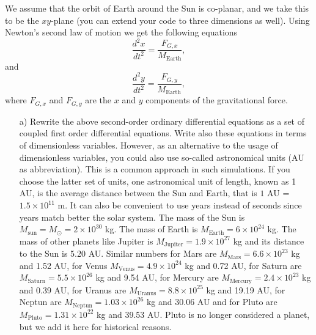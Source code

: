 \documentclass[11pt,a4wide]{article}
\begin{document}
We assume that the orbit of Earth around the Sun 
is co-planar, and we take this to be the $xy$-plane (you can extend your code to three dimensions as well).
Using Newton's second law of motion we get the following equations
\[
\frac{d^2x}{dt^2}=\frac{F_{G,x}}{M_{\mathrm{Earth}}},
\]
and 
\[
\frac{d^2y}{dt^2}=\frac{F_{G,y}}{M_{\mathrm{Earth}}},
\]
where $F_{G,x}$ and $F_{G,y}$ are the $x$ and $y$ components of the gravitational force. 
\begin{enumerate}
\item[a)]  Rewrite the above second-order ordinary differential equations as a set of coupled first order
differential equations. Write also these equations in terms of dimensionless  variables.  
However, as an alternative to the usage of dimensionless variables, you could also
use so-called  astronomical units (AU as abbreviation). 
This is a common approach in such simulations.
If you choose the latter set of units, 
one astronomical unit of length, known as 1 AU, is the average distance between the Sun and Earth, that is
$1$ AU = $1.5\times 10^{11}$ m.  It can also be convenient to use years instead of seconds since years match
better the solar system. The mass of the Sun is $M_{\mathrm{sun}}=M_{\odot}=2\times 10^{30}$ kg. The mass of Earth is
$M_{\mathrm{Earth}}=6\times 10^{24}$ kg. The mass of other planets like Jupiter is 
$M_{\mathrm{Jupiter}}=1.9\times 10^{27}$ kg and its distance to the Sun is 5.20 AU. Similar numbers for Mars
are $M_{\mathrm{Mars}}=6.6\times 10^{23}$ kg and  1.52 AU, for Venus $M_{\mathrm{Venus}}=4.9\times 10^{24}$ kg and  0.72 AU, for Saturn are $M_{\mathrm{Saturn}}=5.5\times 10^{26}$ kg and  9.54 AU, for Mercury are $M_{\mathrm{Mercury}}=2.4\times 10^{23}$ kg and  0.39 AU, for Uranus are $M_{\mathrm{Uranus}}=8.8\times 10^{25}$ kg and  19.19 AU, for Neptun are $M_{\mathrm{Neptun}}=1.03\times 10^{26}$ kg and  30.06 AU and for Pluto are $M_{\mathrm{Pluto}}=1.31\times 10^{22}$ kg and  39.53 AU. Pluto is no longer considered  a planet, but we add it here for historical reasons.


\end{enumerate}
\end{document}
